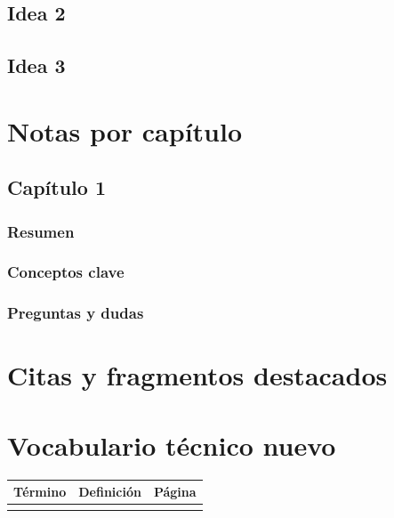 \subsection{Idea 2}\label{idea-2}

\subsection{Idea 3}\label{idea-3}

\section{Notas por capítulo}\label{notas-por-capuxedtulo}

\subsection{Capítulo 1}\label{capuxedtulo-1}

\subsubsection{Resumen}\label{resumen}

\subsubsection{Conceptos clave}\label{conceptos-clave}

\subsubsection{Preguntas y dudas}\label{preguntas-y-dudas}

\section{Citas y fragmentos destacados}\label{citas-y-fragmentos-destacados}

\section{Vocabulario técnico nuevo}\label{vocabulario-tuxe9cnico-nuevo}

{\def\LTcaptype{none} %
\begin{longtable}[]{@{}lll@{}}
\toprule\noalign{}
Término & Definición & Página \\
\midrule\noalign{}
\endhead
\bottomrule\noalign{}
\endlastfoot
& & \\
\end{longtable}
}

